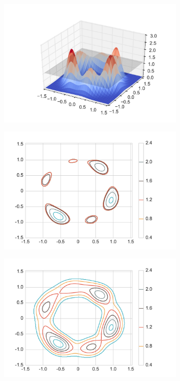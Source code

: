 \documentclass[12pt]{article}
\begin{document}
\begin{figure}
  \begin{subfigure}{.27\linewidth}
    \centering
    \caption{}
        \includegraphics[width=\linewidth]{figure_2_3d_repr.pdf}
    \label{fig:example_3d}
  \end{subfigure}
    \begin{subfigure}{.25\linewidth}
    \centering
    \caption{}
        \includegraphics[width=\linewidth]{figure_2_contour_1.pdf}
    \label{fig:example_contour1}
  \end{subfigure}
    \begin{subfigure}{.25\linewidth}
    \centering
    \caption{}
        \includegraphics[width=\linewidth]{figure_2_contour_2.pdf}

\end{subfigure}
\end{figure}
\end{document}
